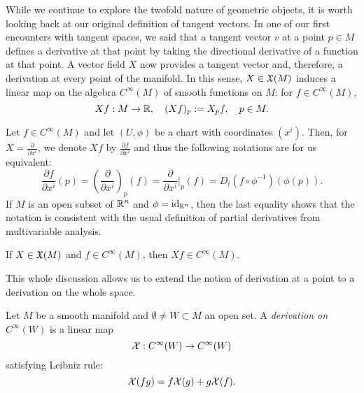 
While we continue to explore the twofold nature of geometric objects, it is worth looking back at our original definition of tangent vectors.
In one of our first encounters with tangent spaces, we said that a tangent vector $v$ at a point $p\in M$ defines a derivative at that point by taking the directional derivative of a function at that point.
A vector field $X$ now provides a tangent vector and, therefore, a derivation at every point of the manifold.
In this sense, $X\in\mathfrak{X}(M)$ induces a linear map on the algebra $C^\infty(M)$ of smooth functions on $M$: for $f\in C^\infty(M)$,
\begin{equation}\label{eq:diff_directional_derivative}
  Xf : M\to\mathbb{R}, \quad
  (Xf)_p := X_p f, \quad p\in M.
\end{equation}

\begin{notation}\label{notation:derivative}
  Let $f\in C^\infty(M)$ and let $(U, \phi)$ be a chart with coordinates $(x^i)$.
  Then, for $X = \frac{\partial}{\partial x^i}$, we denote $Xf$ by $\frac{\partial f}{\partial x^i}$ and thus the following notations are for us equivalent:
  \begin{equation}
    \frac{\partial f}{\partial x^i}(p)
    = \left(\frac{\partial}{\partial x^i}\right)_p(f)
    = \frac{\partial}{\partial x^i}\Big|_p(f)
    = D_i(f\circ\phi^{-1})(\phi(p)).
  \end{equation}
  If $M$ is an open subset of $\mathbb{R}^n$ and $\phi=\operatorname{id}_{\mathbb{R}^n}$, then the last equality shows that the notation is consistent with the usual definition of partial derivatives from multivariable analysis.
\end{notation}

\begin{exercise}
  If $X\in\mathfrak{X}(M)$ and $f\in C^\infty(M)$, then $Xf\in C^\infty(M)$.
\end{exercise}

This whole discussion allows us to extend the notion of derivation at a point to a derivation on the whole space.
\begin{definition}
  Let $M$ be a smooth manifold and $\emptyset\neq W\subset M$ an open set.
  A \emph{derivation on $C^\infty(W)$} is a linear map
  \begin{equation}
    \mathcal{X}:C^\infty(W)\to C^\infty(W)
  \end{equation}
  satisfying Leibniz rule:
  \begin{equation}
    \mathcal{X}(fg) = f \mathcal{X}(g) + g \mathcal{X}(f).
  \end{equation}
\end{definition}

